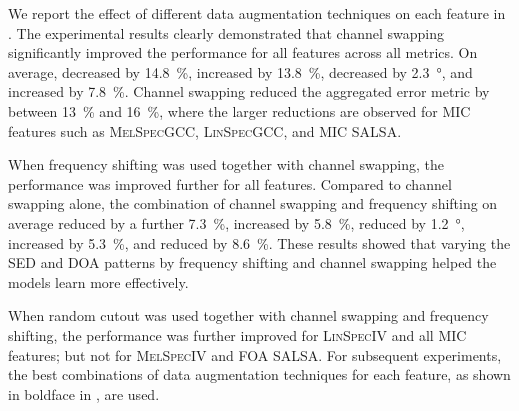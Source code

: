 \documentclass[journal]{IEEEtran}
\newcommand{\ER}{\xspace}
\newcommand{\Fone}{\xspace}
\newcommand{\LE}{\xspace}
\newcommand{\LR}{\xspace}
\newcommand{\Eseld}{\xspace}
\begin{document}
We report the effect of different data augmentation techniques on each feature in . The experimental results clearly demonstrated that channel swapping significantly improved the performance for all features across all metrics. On average, \ER decreased by \SI{14.8}{\percent}, \Fone increased by \SI{13.8}{\percent}, \LE decreased by \SI{2.3}{\degree}, and \LR increased by \SI{7.8}{\percent}. Channel swapping reduced the aggregated error metric \Eseld by between \SI{13}{\percent} and \SI{16}{\percent}, where the larger reductions are observed for MIC features such as \textsc{MelSpecGCC}, \textsc{LinSpecGCC}, and MIC SALSA.  

When frequency shifting was used together with channel swapping, the performance was improved further for all features. Compared to channel swapping alone, the combination of channel swapping and frequency shifting on average reduced \ER by a further \SI{7.3}{\percent}, increased \Fone by \SI{5.8}{\percent}, reduced \LE by \SI{1.2}{\degree}, increased \LR by \SI{5.3}{\percent}, and reduced \Eseld by \SI{8.6}{\percent}. These results showed that varying the SED and DOA patterns by frequency shifting and channel swapping helped the models learn more effectively. 

When random cutout was used together with channel swapping and frequency shifting, the performance was further improved for \textsc{LinSpecIV} and all MIC features; but not for \textsc{MelSpecIV} and FOA SALSA. For subsequent experiments, the best combinations of data augmentation techniques for each feature, as shown in boldface in , are used.
\end{document}
